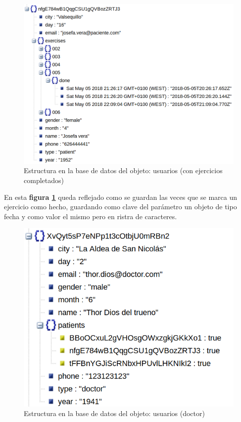 \medskip
\begin{figure}
    \includegraphics[width=\linewidth]{./images/database/users-patient-with-exercises-done-database.png}
    \caption{Estructura en la base de datos del objeto: usuarios (con ejercicios completados)}
    \label{usuario-con-ejercicios}
\end{figure}

En esta \textbf{figura \ref{usuario-con-ejercicios}} queda reflejado como
se guardan las veces que se marca un ejercicio como hecho, guardando como clave
del parámetro un objeto de tipo fecha y como valor el mismo pero en ristra de
caracteres.

\medskip
\begin{figure}
    \includegraphics[width=\linewidth]{./images/database/users-doctor-database.png}
    \caption{Estructura en la base de datos del objeto: usuarios (doctor)}
    \label{usuario-doctor}
\end{figure}

